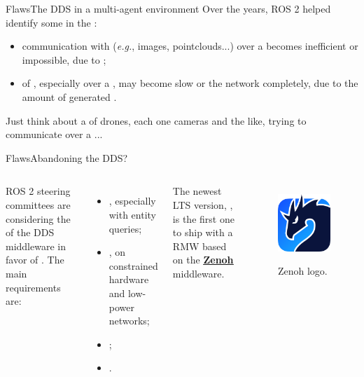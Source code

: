 \begin{frame}{Flaws}{The DDS in a multi-agent environment}
  Over the years, ROS 2 helped identify some  in the :
  \begin{itemize}
    \item communication with  (\emph{e.g.}, images, pointclouds...) over a  becomes inefficient or impossible, due to ;
    \item {} of , especially over a , may become slow or  the network completely, due to the amount of generated .
  \end{itemize}
  Just think about a  of drones, each one cameras and the like, trying to communicate over a ...
\end{frame}
\begin{frame}{Flaws}{Abandoning the DDS?}
  \begin{columns}
    ROS 2 steering committees are considering the  of the DDS middleware in favor of . The main requirements are:
    \begin{itemize}
      \item {}, especially with entity queries;
      \item {}, on constrained hardware and low-power networks;
      \item {};
      \item {}.
    \end{itemize}
    \bigskip
    The newest LTS version, , is the first one to ship with a RMW based on the \href{https://zenoh.io/}{\color{blue}\textbf{\underline{Zenoh}}} middleware.

    \begin{figure}
      \centering
      \includegraphics[width=.65\textwidth]{zenoh}
      \label{fig:zenoh}
      \caption{Zenoh logo.}
    \end{figure}
  \end{columns}
\end{frame}

